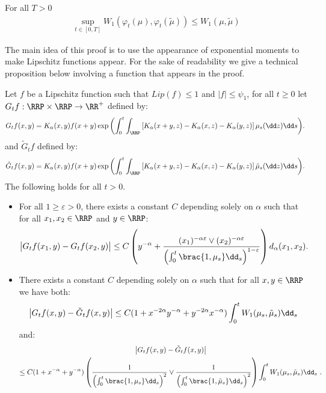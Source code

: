 \begin{lemma}
    For all $T > 0$
    \begin{align*}
        \sup\limits_{t \in [0,T]} W_1\left(\varphi_t(\mu),\varphi_t(\tilde{\mu}) \right) \leq W_1(\mu,\tilde{\mu})
    \end{align*}
\end{lemma}
The main idea of this proof is to use the appearance of exponential moments to make Lipschitz functions appear. For the sake of readability we give a technical proposition below involving a function that appears in the proof.
\begin{proposition}\label{prop:technical-lip-G}
    Let $f$ be a Lipschitz function such that $Lip(f) \leq 1$ and $|f| \leq \psi_1$, for all $t \geq 0$ let $G_tf : \RRP\times \RRP \to \RR^+$ defined by:
    \begin{align*}
        G_tf(x,y) = K_\alpha (x,y)f(x+y)\exp{\left(\int_0^t\int_{\RRP}\left[ K_\alpha(x+y,z) - K_\alpha(x,z) -K_\alpha(y,z)\right] \mu_s(\dd z) \dd s\right)}. \
    \end{align*}
    and $\tilde{G}_tf$ defined by:
    \begin{align*}
        \tilde{G}_tf(x,y) = K_\alpha (x,y)f(x+y)\exp{\left(\int_0^t\int_{\RRP}\left[ K_\alpha(x+y,z) - K_\alpha(x,z) -K_\alpha(y,z)\right] \tilde{\mu}_s(\dd z) \dd s\right)}. \
    \end{align*}
    The following holds for all $t > 0$.
    \begin{itemize}
        \item For all $1 \geq \varepsilon > 0$, there exists a constant $C$ depending solely on $\alpha$ such that for all $x_1,x_2 \in \RRP$ and $y\in \RRP$:
        \begin{align*}
            \left|\vphantom{A^2} G_tf(x_1,y) - G_tf(x_2,y)\right| \leq C\left( y^{-\alpha} + \dfrac{(x_1)^{-\alpha\varepsilon} \vee (x_2)^{-\alpha\varepsilon}}{\left(\int_0^t \brac{1,\mu_s} \dd_s\right)^{1 - \varepsilon}}\right) d_\alpha(x_1,x_2) .
        \end{align*}
        \item There exists a constant $C$ depending solely on $\alpha$ such that for all $x,y \in \RRP$ we have both:
        \begin{align*}
            \left|\vphantom{A^2} G_tf(x,y) - \tilde{G}_tf(x,y)\right| \leq C(1 + x^{-2\alpha}y^{-\alpha} + y^{-2\alpha}x^{-\alpha}) \int_0^t W_1(\mu_s,\tilde{\mu}_s) \dd_s
        \end{align*}
        and:
        \begin{multline*}
            \left|\vphantom{A^2} G_tf(x,y) - \tilde{G}_tf(x,y)\right|\\
            \leq C(1 + x^{-\alpha} + y^{-\alpha})  \left(\dfrac{1}{\left(\int_0^t \brac{1,\mu_s} \dd _s\right)^2} \vee \dfrac{1}{\left(\int_0^t \brac{1,\tilde{\mu}_s} \dd _s\right)^2} \right) \int_0^t W_1(\mu_s,\tilde{\mu}_s) \dd_s\ .
        \end{multline*}
    \end{itemize}
\end{proposition}
